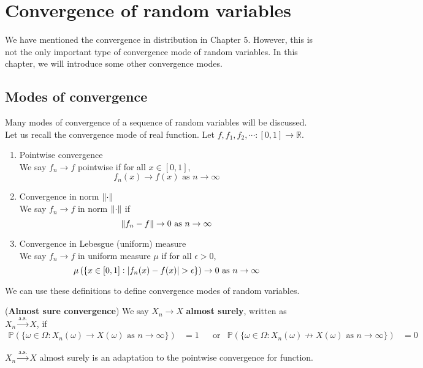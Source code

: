 \documentclass{huhtakm-template-book}
\newcommand{\prob}{\mathbb{P}}
\begin{document}
\chapter{Convergence of random variables}
We have mentioned the convergence in distribution in Chapter $5$. However, this is not the only important type of convergence mode of random variables. In this chapter, we will introduce some other convergence modes.
\section{Modes of convergence}
Many modes of convergence of a sequence of random variables will be discussed.\\
Let us recall the convergence mode of real function. Let $f,f_{1},f_{2},\cdots:[0,1]\to\mathbb{R}$.
\begin{enumerate}
	\item Pointwise convergence\\
	We say $f_{n}\to f$ pointwise if for all $x\in[0,1]$,
	\begin{equation*}
		f_{n}(x)\to f(x)\text{ as }n\to\infty
	\end{equation*}
	\item Convergence in norm $\lVert{\cdot}\rVert$\\
	We say $f_{n}\to f$ in norm $\lVert{\cdot}\rVert$ if
	\begin{equation*}
		\lVert{f_{n}-f}\rVert\to 0\text{ as }n\to\infty
	\end{equation*}
	\item Convergence in Lebesgue (uniform) measure\\
	We say $f_{n}\to f$ in uniform measure $\mu$ if for all $\epsilon>0$,
	\begin{equation*}
		\mu\left(\{x\in[0,1]:\abs{f_{n}(x)-f(x)}>\epsilon\}\right)\to 0\text{ as }n\to\infty
	\end{equation*}
\end{enumerate}
We can use these definitions to define convergence modes of random variables.
\begin{defn}(\textbf{Almost sure convergence})
	We say $X_{n}\to X$ \textbf{almost surely}, written as $X_{n}\xrightarrow{\text{a.s.}}X$, if
	\begin{align*}
		\prob(\{\omega\in\Omega:X_{n}(\omega)\to X(\omega)\text{ as }n\to\infty\})&=1 & &\text{or} & \prob(\{\omega\in\Omega:X_{n}(\omega)\not\to X(\omega)\text{ as }n\to\infty\})&=0
	\end{align*}
\end{defn}
\begin{rem}
	$X_{n}\xrightarrow{\text{a.s.}}X$ almost surely is an adaptation to the pointwise convergence for function.
\end{rem}
\end{document}
